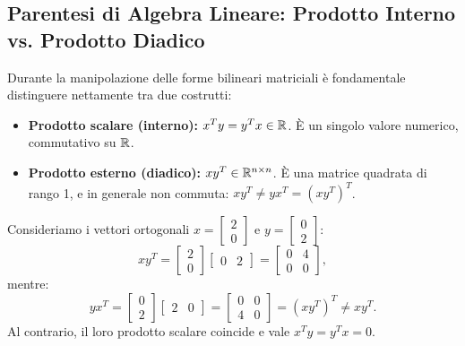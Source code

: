 \subsection{Parentesi di Algebra Lineare: Prodotto Interno vs. Prodotto Diadico}
Durante la manipolazione delle forme bilineari matriciali \`e fondamentale distinguere nettamente tra due costrutti:
\begin{itemize}
    \item \textbf{Prodotto scalare (interno):} $x^T y = y^T x \in \mathbb{R}$. \`E un singolo valore numerico, commutativo su $\mathbb{R}$.
    \item \textbf{Prodotto esterno (diadico):} $x y^T \in \mathbb{R}^{n \times n}$. \`E una matrice quadrata di rango 1, e in generale non commuta: $x y^T \neq y x^T = (x y^T)^T$.
\end{itemize}

\begin{example}
Consideriamo i vettori ortogonali $x = \begin{bmatrix} 2 \\ 0 \end{bmatrix}$ e $y = \begin{bmatrix} 0 \\ 2 \end{bmatrix}$:
\begin{equation}
    x y^T = \begin{bmatrix} 2 \\ 0 \end{bmatrix} \begin{bmatrix} 0 & 2 \end{bmatrix} = \begin{bmatrix} 0 & 4 \\ 0 & 0 \end{bmatrix},
\end{equation}
mentre:
\begin{equation}
    y x^T = \begin{bmatrix} 0 \\ 2 \end{bmatrix} \begin{bmatrix} 2 & 0 \end{bmatrix} = \begin{bmatrix} 0 & 0 \\ 4 & 0 \end{bmatrix} = (x y^T)^T \neq x y^T.
\end{equation}
Al contrario, il loro prodotto scalare coincide e vale $x^T y = y^T x = 0$.
\end{example}

